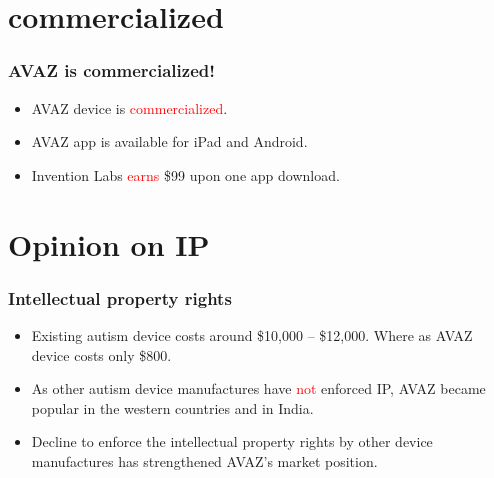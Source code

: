 \documentclass[12pt]{beamer}
\begin{document}
\section{commercialized}
\begin{frame}
	\frametitle {AVAZ is commercialized!}
	\begin{itemize}
		\item AVAZ device is \textcolor{red}{commercialized}.
		\item AVAZ app is available for iPad and Android.
		\item Invention Labs \textcolor{red}{earns} \$99 upon one app download.
	\end{itemize}
\end{frame}

\section{Opinion on IP}
\begin{frame}
	\frametitle {Intellectual property rights}
	\begin{itemize}
		\item Existing autism device costs around \$10,000 -- \$12,000. Where as AVAZ device costs only \$800. 
		\item As other autism device manufactures have \textcolor{red}{not} enforced IP, AVAZ became popular in the western countries and in India. 
		\item Decline to enforce the intellectual property rights by other device manufactures has strengthened AVAZ's market position.
	\end{itemize}
\end{frame}

\end{document}
